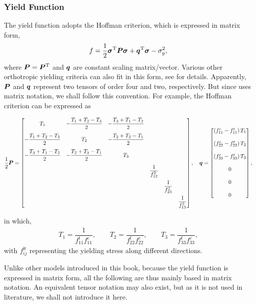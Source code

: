 \subsubsection{Yield Function}
The yield function adopts the Hoffman criterion, which is expressed in matrix form,
\begin{gather}\label{eq:orthotropic_yield_function_proto}
f=\dfrac{1}{2}\bm{\sigma}^{\mathrm{T}}\bm{P}\bm{\sigma}+\bm{q}^{\mathrm{T}}\bm{\sigma}-\sigma_y^2,
\end{gather}
where $\bm{P}=\bm{P}^{\mathrm{T}}$ and $\bm{q}$ are constant scaling matrix/vector.
Various other orthotropic yielding criteria can also fit in this form, see \cite{Oller2003} for details.
Apparently, $\bm{P}$ and $\bm{q}$ represent two tensors of order four and two, respectively.
But since \cite{Oller2003} uses matrix notation, we shall follow this convention.
For example, the Hoffman criterion can be expressed as
\begin{tiny}
\begin{gather}\label{eq:hoffman_criterion}
\dfrac{1}{2}\bm{P}=\begin{bmatrix}
T_1&-\dfrac{T_1+T_2-T_3}{2}&-\dfrac{T_3+T_1-T_2}{2}&&&\\[4mm]
-\dfrac{T_1+T_2-T_3}{2}&T_2&-\dfrac{T_2+T_3-T_1}{2}&&&\\[4mm]
-\dfrac{T_3+T_1-T_2}{2}&-\dfrac{T_2+T_3-T_1}{2}&T_3&&&\\[4mm]
&&&\dfrac{1}{f_{12}^2}&&\\[4mm]
&&&&\dfrac{1}{f_{23}^2}&\\[4mm]
&&&&&\dfrac{1}{f_{13}^2}
\end{bmatrix},\quad
\bm{q}=\begin{bmatrix}
\left(f_{11}^c-f_{11}^t\right)T_1\\[4mm]
\left(f_{22}^c-f_{22}^t\right)T_2\\[4mm]
\left(f_{33}^c-f_{33}^t\right)T_3\\[4mm]
0\\[4mm]
0\\[4mm]
0
\end{bmatrix},
\end{gather}
\end{tiny}
in which,
\begin{gather}
T_1=\dfrac{1}{f_{11}^tf_{11}^c},\qquad
T_2=\dfrac{1}{f_{22}^tf_{22}^c},\qquad
T_3=\dfrac{1}{f_{33}^tf_{33}^c},
\end{gather}
with $f_{ij}^\aleph$ representing the yielding stress along different directions.

Unlike other models introduced in this book, because the yield function is expressed in matrix form, all the following are thus mainly based in matrix notation.
An equivalent tensor notation may also exist, but as it is not used in literature, we shall not introduce it here.
